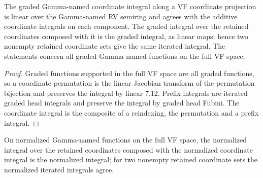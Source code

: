 \begin{theorem}

\label{s7-gn-11-linear}


\leanok

The graded Gamma-named coordinate integral along a VF coordinate projection is linear over the Gamma-named RV semiring and agrees with the additive coordinate integrals on each component. The graded integral over the retained coordinates composed with it is the graded integral, as linear maps; hence two nonempty retained coordinate sets give the same iterated integral. The statements concern all graded Gamma-named functions on the full VF space.

\end{theorem}

\begin{proof}


\leanok

Graded functions supported in the full VF space are all graded functions, so a coordinate permutation is the linear Jacobian transform of the permutation bijection and preserves the integral by linear 7.12. Prefix integrals are iterated graded head integrals and preserve the integral by graded head Fubini. The coordinate integral is the composite of a reindexing, the permutation and a prefix integral.

\end{proof}

\begin{theorem}

\label{s7-gn-14-normalized}


\leanok

On normalized Gamma-named functions on the full VF space, the normalized integral over the retained coordinates composed with the normalized coordinate integral is the normalized integral; for two nonempty retained coordinate sets the normalized iterated integrals agree.

\end{theorem}

